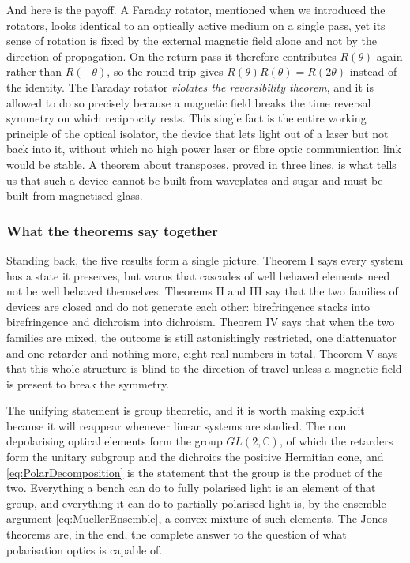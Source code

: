             And here is the payoff. A Faraday rotator, mentioned when we introduced the rotators, looks identical to an optically active medium on a single pass, yet its sense of rotation is fixed by the external magnetic field alone and not by the direction of propagation. On the return pass it therefore contributes $R(\theta)$ again rather than $R(-\theta)$, so the round trip gives $R(\theta)R(\theta)=R(2\theta)$ instead of the identity. The Faraday rotator \emph{violates the reversibility theorem}, and it is allowed to do so precisely because a magnetic field breaks the time reversal symmetry on which reciprocity rests. This single fact is the entire working principle of the optical isolator, the device that lets light out of a laser but not back into it, without which no high power laser or fibre optic communication link would be stable. A theorem about transposes, proved in three lines, is what tells us that such a device cannot be built from waveplates and sugar and must be built from magnetised glass.

        \subsubsection{What the theorems say together}

            Standing back, the five results form a single picture. Theorem I says every system has a state it preserves, but warns that cascades of well behaved elements need not be well behaved themselves. Theorems II and III say that the two families of devices are closed and do not generate each other: birefringence stacks into birefringence and dichroism into dichroism. Theorem IV says that when the two families are mixed, the outcome is still astonishingly restricted, one diattenuator and one retarder and nothing more, eight real numbers in total. Theorem V says that this whole structure is blind to the direction of travel unless a magnetic field is present to break the symmetry.

            The unifying statement is group theoretic, and it is worth making explicit because it will reappear whenever linear systems are studied. The non depolarising optical elements form the group $GL(2,\mathbb{C})$, of which the retarders form the unitary subgroup and the dichroics the positive Hermitian cone, and \ref{eq:PolarDecomposition} is the statement that the group is the product of the two. Everything a bench can do to fully polarised light is an element of that group, and everything it can do to partially polarised light is, by the ensemble argument \ref{eq:MuellerEnsemble}, a convex mixture of such elements. The Jones theorems are, in the end, the complete answer to the question of what polarisation optics is capable of.

